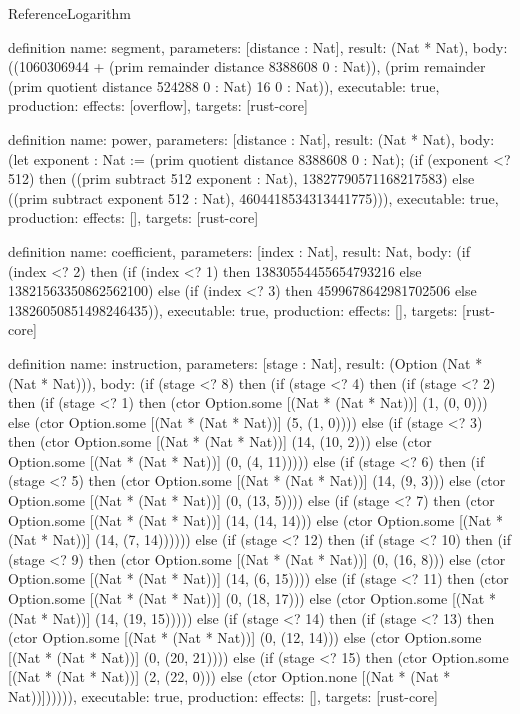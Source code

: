 \begin{lexlean}{ReferenceLogarithm}
\begin{semanticmodule}
definition{
  name: segment,
  parameters: [distance : Nat],
  result: (Nat * Nat),
  body: ((1060306944 + (prim remainder distance 8388608 0 : Nat)), (prim remainder (prim quotient distance 524288 0 : Nat) 16 0 : Nat)),
  executable: true,
  production: {effects: [overflow], targets: [rust-core]}
}

definition{
  name: power,
  parameters: [distance : Nat],
  result: (Nat * Nat),
  body: (let exponent : Nat := (prim quotient distance 8388608 0 : Nat); (if (exponent <? 512) then ((prim subtract 512 exponent : Nat), 13827790571168217583) else ((prim subtract exponent 512 : Nat), 4604418534313441775))),
  executable: true,
  production: {effects: [], targets: [rust-core]}
}

definition{
  name: coefficient,
  parameters: [index : Nat],
  result: Nat,
  body: (if (index <? 2) then (if (index <? 1) then 13830554455654793216 else 13821563350862562100) else (if (index <? 3) then 4599678642981702506 else 13826050851498246435)),
  executable: true,
  production: {effects: [], targets: [rust-core]}
}

definition{
  name: instruction,
  parameters: [stage : Nat],
  result: (Option (Nat * (Nat * Nat))),
  body: (if (stage <? 8) then (if (stage <? 4) then (if (stage <? 2) then (if (stage <? 1) then (ctor Option.some [(Nat * (Nat * Nat))] (1, (0, 0))) else (ctor Option.some [(Nat * (Nat * Nat))] (5, (1, 0)))) else (if (stage <? 3) then (ctor Option.some [(Nat * (Nat * Nat))] (14, (10, 2))) else (ctor Option.some [(Nat * (Nat * Nat))] (0, (4, 11))))) else (if (stage <? 6) then (if (stage <? 5) then (ctor Option.some [(Nat * (Nat * Nat))] (14, (9, 3))) else (ctor Option.some [(Nat * (Nat * Nat))] (0, (13, 5)))) else (if (stage <? 7) then (ctor Option.some [(Nat * (Nat * Nat))] (14, (14, 14))) else (ctor Option.some [(Nat * (Nat * Nat))] (14, (7, 14)))))) else (if (stage <? 12) then (if (stage <? 10) then (if (stage <? 9) then (ctor Option.some [(Nat * (Nat * Nat))] (0, (16, 8))) else (ctor Option.some [(Nat * (Nat * Nat))] (14, (6, 15)))) else (if (stage <? 11) then (ctor Option.some [(Nat * (Nat * Nat))] (0, (18, 17))) else (ctor Option.some [(Nat * (Nat * Nat))] (14, (19, 15))))) else (if (stage <? 14) then (if (stage <? 13) then (ctor Option.some [(Nat * (Nat * Nat))] (0, (12, 14))) else (ctor Option.some [(Nat * (Nat * Nat))] (0, (20, 21)))) else (if (stage <? 15) then (ctor Option.some [(Nat * (Nat * Nat))] (2, (22, 0))) else (ctor Option.none [(Nat * (Nat * Nat))]))))),
  executable: true,
  production: {effects: [], targets: [rust-core]}
}


\end{semanticmodule}
\end{lexlean}
